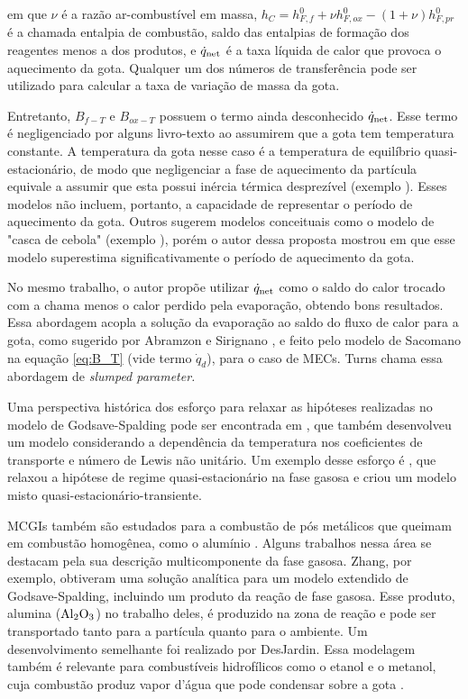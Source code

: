 em que $\nu$ é a razão ar-combustível em massa, $h_C=h^0_{F,f} + \nu h^0_{F,ox} - (1+\nu)h^0_{F,pr}$ é a chamada entalpia de combustão, saldo das entalpias de formação dos reagentes menos a dos produtos, e $\dot q_{\mathrm{net}}$ é a taxa líquida de calor que provoca o aquecimento da gota.
Qualquer um dos números de transferência pode ser utilizado para calcular a taxa de variação de massa da gota.

Entretanto, $B_{f-T}$ e $B_{ox-T}$ possuem o termo ainda desconhecido $\dot q_{\mathrm{net}}$.
Esse termo é negligenciado por alguns livro-texto \cite{Glassman2008,Williams1985} ao assumirem que a gota tem temperatura constante. 
A temperatura da gota nesse caso é a temperatura de equilíbrio quasi-estacionário, de modo que negligenciar a fase de aquecimento da partícula equivale a assumir que esta possui inércia térmica desprezível (exemplo \cite{Turns2000,Glassman2008}). 
Esses modelos não incluem, portanto, a capacidade de representar o  período de aquecimento da gota.
Outros sugerem modelos conceituais como o modelo de "casca de cebola" (exemplo \cite[p. 385]{Turns2000}), porém o autor dessa proposta mostrou em \cite{HenningsJ2024MT} que esse modelo superestima significativamente o período de aquecimento da gota.

No mesmo trabalho, o autor propõe utilizar $\dot q_{\mathrm{net}}$ como o saldo do calor trocado com a chama menos o calor perdido pela evaporação, obtendo bons resultados.
Essa abordagem acopla a solução da evaporação ao saldo do fluxo de calor para a gota, como sugerido por Abramzon e Sirignano \cite{Sirignano1989}, e feito pelo modelo de Sacomano\etal \cite{SacomanoF2022IJHMT} na equação \eqref{eq:B_T} (vide termo $\dot q_d$), para o caso de MECs.
Turns \cite{Turns2000} chama essa abordagem de \emph{slumped parameter.}

Uma perspectiva histórica dos esforço para relaxar as hipóteses realizadas no modelo de Godsave-Spalding pode ser encontrada em \cite{FachiniF1999}, que também desenvolveu um modelo considerando a dependência da temperatura nos coeficientes de transporte e número de Lewis não unitário.
Um exemplo desse esforço é \cite{UlzamaS2007}, que relaxou a hipótese de regime quasi-estacionário na fase gasosa e criou um modelo misto quasi-estacionário-transiente.%

MCGIs também são estudados para a combustão de pós metálicos que queimam em combustão homogênea, como o alumínio \cite[p. 7]{Bergthorson2015}.
Alguns trabalhos nessa área se destacam pela sua descrição multicomponente da fase gasosa. 
Zhang\etal \cite{Zhang2022_Coflow,Zhang2022_Counterflow}, por exemplo, obtiveram uma solução analítica para um modelo extendido de Godsave-Spalding, incluindo um produto da reação de fase gasosa.
Esse produto, alumina ($\mathrm{Al}_2 \mathrm{O}_3$) no trabalho deles, é produzido na zona de reação e pode ser transportado tanto para a partícula quanto para o ambiente.
Um desenvolvimento semelhante foi realizado por DesJardin\etal \cite{DesJardin2005}.
Essa modelagem também é relevante para combustíveis hidrofílicos como o etanol e o metanol, cuja combustão produz vapor d'água que pode condensar sobre a  gota \cite{SacomanoF2024CF,SacomanoF2025CF}.



